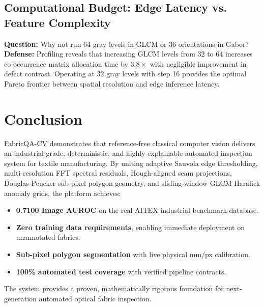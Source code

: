 \documentclass[10pt,a4paper]{article}
\begin{document}
\subsection{Computational Budget: Edge Latency vs. Feature Complexity}
\textbf{Question:} Why not run 64 gray levels in GLCM or 36 orientations in Gabor?\\
\textbf{Defense:} Profiling reveals that increasing GLCM levels from 32 to 64 increases co-occurrence matrix allocation time by $3.8\times$ with negligible improvement in defect contrast. Operating at 32 gray levels with step 16 provides the optimal Pareto frontier between spatial resolution and edge inference latency.

\section{Conclusion}
FabricQA-CV demonstrates that reference-free classical computer vision delivers an industrial-grade, deterministic, and highly explainable automated inspection system for textile manufacturing. By uniting adaptive Sauvola edge thresholding, multi-resolution FFT spectral residuals, Hough-aligned seam projections, Douglas-Peucker sub-pixel polygon geometry, and sliding-window GLCM Haralick anomaly grids, the platform achieves:
\begin{itemize}[leftmargin=1.5em,itemsep=2pt]
    \item \textbf{0.7100 Image AUROC} on the real AITEX industrial benchmark database.
    \item \textbf{Zero training data requirements}, enabling immediate deployment on unannotated fabrics.
    \item \textbf{Sub-pixel polygon segmentation} with live physical mm/px calibration.
    \item \textbf{100\% automated test coverage} with verified pipeline contracts.
\end{itemize}
The system provides a proven, mathematically rigorous foundation for next-generation automated optical fabric inspection.
\end{document}
